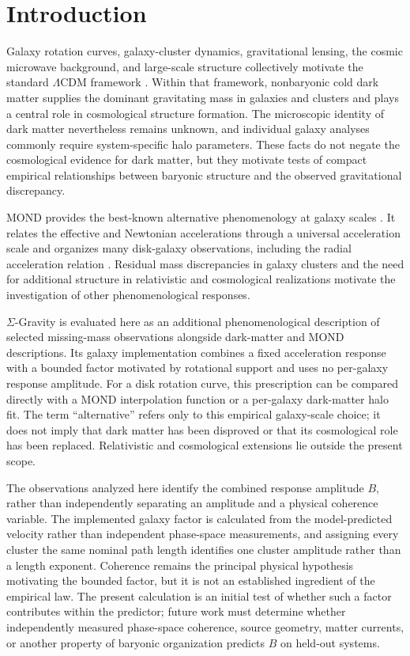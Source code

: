 \documentclass[utf8]{FrontiersinHarvard}
\begin{document}
\section{Introduction}\label{introduction}



Galaxy rotation curves, galaxy-cluster dynamics, gravitational lensing, the cosmic microwave background, and large-scale structure collectively motivate the standard \(\Lambda\)CDM framework \citep{planck2020}. Within that framework, nonbaryonic cold dark matter supplies the dominant gravitating mass in galaxies and clusters and plays a central role in cosmological structure formation. The microscopic identity of dark matter nevertheless remains unknown, and individual galaxy analyses commonly require system-specific halo parameters. These facts do not negate the cosmological evidence for dark matter, but they motivate tests of compact empirical relationships between baryonic structure and the observed gravitational discrepancy.

MOND provides the best-known alternative phenomenology at galaxy scales \citep{milgrom1983,sanders2002,famaey2012}. It relates the effective and Newtonian accelerations through a universal acceleration scale and organizes many disk-galaxy observations, including the radial acceleration relation \citep{mcgaugh2016}. Residual mass discrepancies in galaxy clusters and the need for additional structure in relativistic and cosmological realizations motivate the investigation of other phenomenological responses.

\(\Sigma\)-Gravity is evaluated here as an additional phenomenological description of selected missing-mass observations alongside dark-matter and MOND descriptions. Its galaxy implementation combines a fixed acceleration response with a bounded factor motivated by rotational support and uses no per-galaxy response amplitude. For a disk rotation curve, this prescription can be compared directly with a MOND interpolation function or a per-galaxy dark-matter halo fit. The term ``alternative'' refers only to this empirical galaxy-scale choice; it does not imply that dark matter has been disproved or that its cosmological role has been replaced. Relativistic and cosmological extensions lie outside the present scope.

The observations analyzed here identify the combined response amplitude \(B\), rather than independently separating an amplitude and a physical coherence variable. The implemented galaxy factor is calculated from the model-predicted velocity rather than independent phase-space measurements, and assigning every cluster the same nominal path length identifies one cluster amplitude rather than a length exponent. Coherence remains the principal physical hypothesis motivating the bounded factor, but it is not an established ingredient of the empirical law. The present calculation is an initial test of whether such a factor contributes within the predictor; future work must determine whether independently measured phase-space coherence, source geometry, matter currents, or another property of baryonic organization predicts \(B\) on held-out systems.
\end{document}
